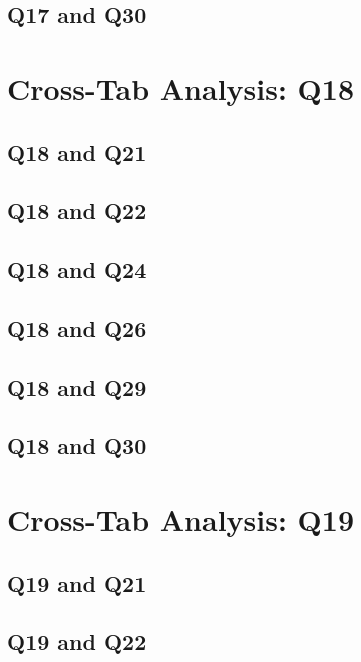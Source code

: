 \documentclass{report}
\begin{document}
\clearpage
\section{Q17 and Q30}


\chapter{Cross-Tab Analysis: Q18}
\section{Q18 and Q21}


\clearpage
\section{Q18 and Q22}


\clearpage
\section{Q18 and Q24}


\clearpage
\section{Q18 and Q26}


\clearpage
\section{Q18 and Q29}


\clearpage
\section{Q18 and Q30}


\chapter{Cross-Tab Analysis: Q19}
\section{Q19 and Q21}


\clearpage
\section{Q19 and Q22}

\end{document}

